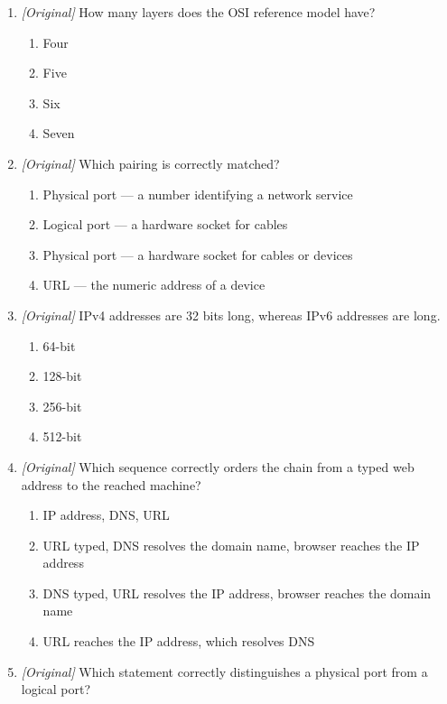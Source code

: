 \begin{enumerate}[label=\textbf{Q\arabic*.}, leftmargin=*]
\begin{enumerate}[label=\Alph*.]
  \end{enumerate}
\item \textit{[Original]} How many layers does the OSI reference model have?
  \begin{enumerate}[label=\Alph*.]
    \item Four
    \item Five
    \item Six
    \item Seven
  \end{enumerate}
\item \textit{[Original]} Which pairing is correctly matched?
  \begin{enumerate}[label=\Alph*.]
    \item Physical port --- a number identifying a network service
    \item Logical port --- a hardware socket for cables
    \item Physical port --- a hardware socket for cables or devices
    \item URL --- the numeric address of a device
  \end{enumerate}
\item \textit{[Original]} IPv4 addresses are 32 bits long, whereas IPv6
  addresses are \underline{\hspace{2.2cm}} long.
  \begin{enumerate}[label=\Alph*.]
    \item 64-bit
    \item 128-bit
    \item 256-bit
    \item 512-bit
  \end{enumerate}
\item \textit{[Original]} Which sequence correctly orders the chain from a
  typed web address to the reached machine?
  \begin{enumerate}[label=\Alph*.]
    \item IP address, DNS, URL
    \item URL typed, DNS resolves the domain name, browser reaches the IP address
    \item DNS typed, URL resolves the IP address, browser reaches the domain name
    \item URL reaches the IP address, which resolves DNS
  \end{enumerate}
\item \textit{[Original]} Which statement correctly distinguishes a physical
  port from a logical port?
  \begin{enumerate}[label=\Alph*.]

\end{enumerate}
\end{enumerate}
